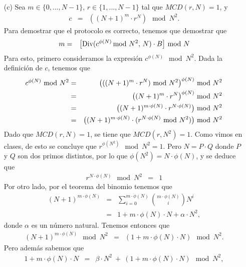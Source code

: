 \documentclass[11pt]{article}
\newcommand{\MCD}{\textit{MCD}}
\begin{document}
\begin{enumerate}
\item[(c)] Sea $m \in \{0, \ldots, N-1\}$, $r \in \{1, \ldots, N-1\}$ tal que $\MCD(r, N) = 1$, y
  \begin{eqnarray*}
    c &=& ((N+1)^m \cdot r^N) \!\! \mod N^2.
  \end{eqnarray*}
  Para demostrar que el protocolo es correcto, tenemos que demostrar que
  \begin{eqnarray*}
    m &=&   \big[\text{Div}(c^{\phi(N)} \!\!\!\mod N^2,\, N)  \cdot B \big] \!\!\mod N
  \end{eqnarray*}
  Para esto, primero consideramos la expresión $c^{\phi(N)} \!\!\!\mod
  N^2$. Dada la definición de $c$, tenemos que
  \begin{eqnarray}\notag
c^{\phi(N)} \!\! \mod N^2 &=& \big(((N+1)^m \cdot r^N) \!\! \mod
  N^2\big)^{\phi(N)} \!\! \mod N^2\\
\notag &=& \big((N+1)^m \cdot r^N\big)^{\phi(N)} \!\! \mod N^2\\
\notag &=& \big((N+1)^{m \cdot \phi(N)} \cdot r^{N \cdot \phi(N)}\big) \!\! \mod N^2\\
\label{eq-tp-2} &=& \big((N+1)^{m \cdot \phi(N)} \cdot (r^{N \cdot \phi(N)} \!\! \mod N^2)\big) \!\! \mod N^2
  \end{eqnarray}
  Dado que %
  $\MCD(r,N) = 1$, se tiene que
$\MCD(r,N^2) = 1$. Como vimos en clases, de esto se concluye que
$r^{\phi(N^2)} \!\! \mod N^2 = 1$. Pero $N = P \cdot Q$ donde $P$ y
$Q$ son dos primos distintos, por lo que $\phi(N^2) = N \cdot
\phi(N)$, y se deduce que
\begin{eqnarray}\label{eq-pr-1}
  r^{N \cdot \phi(N)} \!\! \mod N^2 &=& 1
\end{eqnarray}
Por otro lado, por el teorema del binomio tenemos que
\begin{eqnarray*}
  (N+1)^{m \cdot \phi(N)} &=& \sum_{i=0}^{m \cdot \phi(N)} \binom{m \cdot \phi(N)}{i} N^i\\
  &=& 1 + m \cdot \phi(N) \cdot N + \alpha \cdot N^2,
\end{eqnarray*}
donde $\alpha$ es un número natural. Tenemos entonces que 
\begin{eqnarray*}
  (N+1)^{m \cdot \phi(N)} \!\! \mod N^2 &=& (1 + m \cdot \phi(N) \cdot N) \!\! \mod N^2.
\end{eqnarray*}
Pero además sabemos que
\begin{eqnarray*}
  1 + m \cdot \phi(N) \cdot N &=& \beta \cdot N^2 \ + \ (1 + m \cdot \phi(N) \cdot N) \!\! \mod N^2,
\end{eqnarray*}

\end{enumerate}
\end{document}
